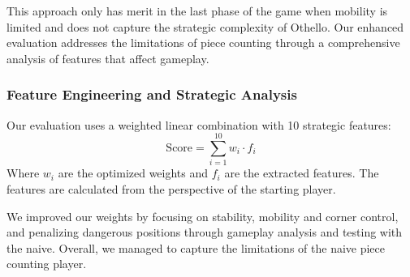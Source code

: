 \documentclass[10pt, titlepage, oneside, a4paper]{article}
\begin{document}
This approach only has merit in the last phase of the game when mobility is limited and does not capture the strategic complexity of Othello. Our enhanced evaluation addresses the limitations of piece counting through a comprehensive analysis of features that affect gameplay.

\subsubsection{Feature Engineering and Strategic Analysis}

Our evaluation uses a weighted linear combination with 10 strategic features:
\begin{equation}
\text{Score} = \sum_{i=1}^{10} w_i \cdot f_i
\end{equation}
Where $w_i$ are the optimized weights and $f_i$ are the extracted features. The features are calculated from the perspective of the starting player.

We improved our weights by focusing on stability, mobility and corner control, and penalizing dangerous positions through gameplay analysis and testing with the naive\cite{brianothello2005}.
Overall, we managed to capture the limitations of the naive piece counting player.
\end{document}
